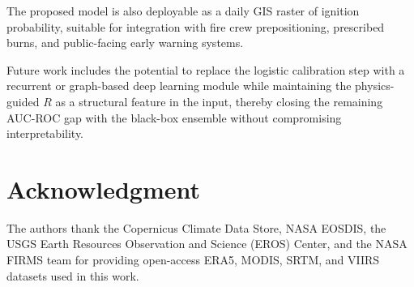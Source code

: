 \documentclass[conference]{IEEEtran}
\begin{document}
The proposed model is also deployable as a daily GIS raster of ignition probability, suitable for integration with fire crew prepositioning, prescribed burns, and public-facing early warning systems.

Future work includes the potential to replace the logistic calibration step with a recurrent or graph-based deep learning module while maintaining the physics-guided $R$ as a structural feature in the input, thereby closing the remaining AUC-ROC gap with the black-box ensemble without compromising interpretability.

\section*{Acknowledgment}

The authors thank the Copernicus Climate Data Store, NASA EOSDIS, the USGS Earth
Resources Observation and Science (EROS) Center, and the NASA FIRMS team for
providing open-access ERA5, MODIS, SRTM, and VIIRS datasets used in this work.
\end{document}
